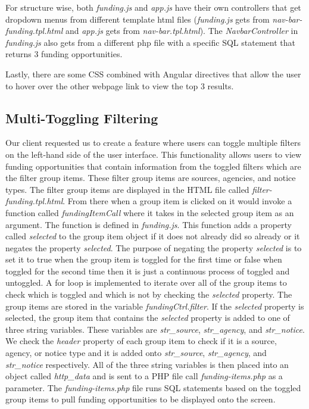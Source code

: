 \documentclass[onecolumn]{IEEEtran}
\begin{document}
For structure wise, both \textit{funding.js} and \textit{app.js} have their own controllers that get dropdown menus from different template html files (\textit{funding.js} gets from \textit{nav-bar-funding.tpl.html} and \textit{app.js} gets from \textit{nav-bar.tpl.html}). The \textit{NavbarController} in \textit{funding.js} also gets from a different php file with a specific SQL statement that returns 3 funding opportunities. 

Lastly, there are some CSS combined with Angular directives that allow the user to hover over the other webpage link to view the top 3 results.


\subsection{Multi-Toggling Filtering}
Our client requested us to create a feature where users can toggle multiple filters on the left-hand side of the user interface. This functionality allows users to view funding opportunities that contain information from the toggled filters which are the filter group items. These filter group items are sources, agencies, and notice types. The filter group items are displayed in the HTML file called \textit{filter-funding.tpl.html}. From there when a group item is clicked on it would invoke a function called \textit{fundingItemCall} where it takes in the selected group item as an argument. The function is defined in \textit{funding.js}. This function adds a property called \textit{selected} to the group item object if it does not already did so already or it negates the property \textit{selected}. The purpose of negating the property \textit{selected} is to set it to true when the group item is toggled for the first time or false when toggled for the second time then it is just a continuous process of toggled and untoggled. A for loop is implemented to iterate over all of the group items to check which is toggled and which is not by checking the \textit{selected} property. The group items are stored in the variable \textit{fundingCtrl.filter}. If the \textit{selected} property is selected, the group item that contains the \textit{selected} property is added to one of three string variables. These variables are \textit{str\_source}, \textit{str\_agency}, and \textit{str\_notice}. We check the \textit{header} property of each group item to check if it is a source, agency, or notice type and it is added onto \textit{str\_source}, \textit{str\_agency}, and \textit{str\_notice} respectively. All of the three string variables is then placed into an object called \textit{http\_data} and is sent to a PHP file call \textit{funding-items.php} as a parameter. The \textit{funding-items.php} file runs SQL statements based on the toggled group items to pull funding opportunities to be displayed onto the screen. 
\end{document}
